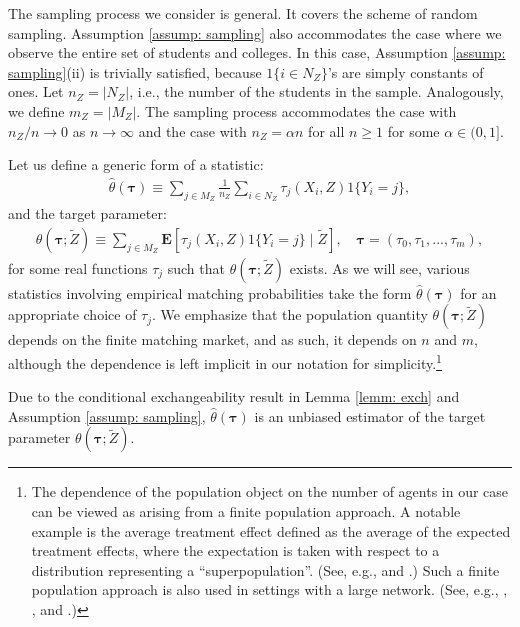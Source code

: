 \documentclass[12pt, fullpage]{amsart}
\theoremstyle{definition}
\theoremstyle{definition}
\theoremstyle{definition}
\begin{document}
\begin{bibunit}[econometrica]
The sampling process we consider is general. It covers the scheme of random sampling. Assumption \ref{assump: sampling} also accommodates the case where we observe the entire set of students and colleges. In this case, Assumption \ref{assump: sampling}(ii) is trivially satisfied, because $1\{i \in N_Z\}$'s are simply constants of ones. Let $n_Z = |N_Z|$, i.e., the number of the students in the sample.  Analogously, we define $m_Z = |M_Z|$. The sampling process accommodates the case with $n_Z /n \rightarrow 0$ as $n \rightarrow \infty$ and the case with $n_Z = \alpha n$ for all $n \ge 1$ for some $\alpha \in (0,1]$. 

Let us define a generic form of a statistic:
\begin{align*}
	\hat \theta(\boldsymbol{\tau}) \equiv \sum_{j \in M_Z} \frac{1}{n_Z} \sum_{i \in N_Z} \tau_j\left( X_i, Z \right) 1\{Y_i = j\},
\end{align*}
and the target parameter:
\begin{align}
	\label{def}
	\theta(\boldsymbol{\tau};\tilde Z) \equiv \sum_{j \in M_Z} \mathbf{E}\left[ \tau_j\left( X_i, Z \right) 1\{Y_i = j\} \mid \tilde Z \right], \quad \boldsymbol{\tau} = (\tau_0,\tau_1,...,\tau_m),
\end{align}
for some real functions $\tau_j$ such that $\theta(\boldsymbol{\tau};\tilde Z)$ exists. As we will see, various statistics involving empirical matching probabilities take the form $\hat{\theta}(\boldsymbol{\tau})$ for an appropriate choice of $\tau_{j}$. We emphasize that the population quantity $\theta(\boldsymbol{\tau};\tilde Z)$ depends on the finite matching market, and as such, it depends on $n$ and $m$, although the dependence is left implicit in our notation for simplicity.\footnote{The dependence of the population object on the number of agents in our case can be viewed as arising from a finite population approach. A notable example is the average treatment effect defined as the average of the expected treatment effects, where the expectation is taken with respect to a distribution representing a ``superpopulation''. (See, e.g., \cite{Imbens/Wooldridge:09:JEL} and \cite{Imai/King/Stuart:08:JRSS}.) Such a finite population approach is also used in settings with a large network. (See, e.g., \cite{Aronow/Samii:17:AAS}, \cite{Leung:20:ReStat}, and \cite{He/Song:23:WP}.)}

Due to the conditional exchangeability result in Lemma \ref{lemm: exch} and Assumption \ref{assump: sampling}, $\hat \theta(\boldsymbol{\tau})$ is an unbiased estimator of the target parameter $\theta(\boldsymbol{\tau};\tilde Z)$. 


\end{bibunit}
\end{document}
